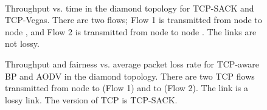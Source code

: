 \documentclass[conference]{IEEEtran}
\begin{document}
\begin{figure}[t!]
\vspace{-0pt}
\begin{center}
 \hspace{-0pt} \\
 \hspace{-0pt}
\end{center}
\begin{center}
\vspace{-5pt}
\caption{\label{fig:diamond_thrpt_time_results} \scriptsize Throughput vs. time in the diamond topology for TCP-SACK and TCP-Vegas. There are two flows; Flow 1 is transmitted from node  to node , and Flow 2 is transmitted from node  to node . The links are not lossy.
}
\vspace{-15pt}
\end{center}
\end{figure}


\begin{figure}[t!]
\vspace{-0pt}
\begin{center}
\end{center}
\begin{center}
\vspace{-5pt}
\caption{\label{fig:diamond_thrpt_vs_loss_sack} \scriptsize Throughput and fairness vs. average packet loss rate for TCP-aware BP and AODV in the diamond topology. There are two TCP flows transmitted from node  to  (Flow 1) and  to  (Flow 2). The link  is a lossy link. The version of TCP is TCP-SACK.}
\end{center}
\vspace{-15pt}
\end{figure}
\end{document}
